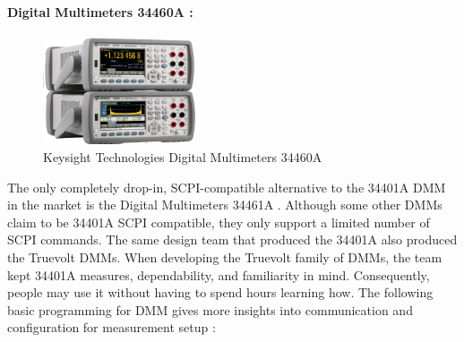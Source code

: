 \paragraph{Digital Multimeters 34460A :}

\begin{figure}[h]
	\centering
	\includegraphics[width=0.4\textwidth]{Chap06/Figures/DMM_34460A.PNG}
	\caption{Keysight Technologies Digital Multimeters 34460A}
	\label{fig:keysight_DMM_34460A}
\end{figure}

The only completely drop-in, SCPI-compatible alternative to the 34401A DMM in the market is the Digital Multimeters 34461A \cite{Keysight_34460A_DMM}. Although some other DMMs claim to be 34401A SCPI compatible, they only support a limited number of SCPI commands. The same design team that produced the 34401A also produced the Truevolt DMMs. When developing the Truevolt family of DMMs, the team kept 34401A measures, dependability, and familiarity in mind. Consequently, people may use it without having to spend hours learning how.
The following basic programming for DMM gives more insights into communication and configuration for measurement setup :

